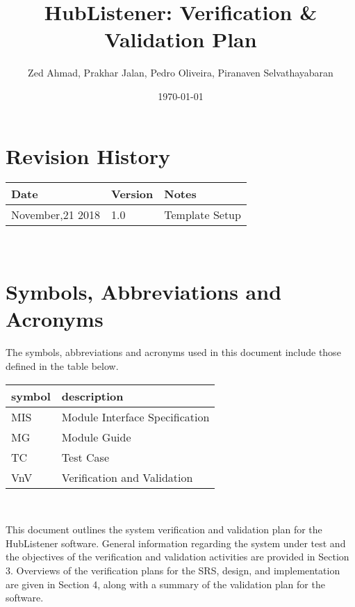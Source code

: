 \documentclass[12pt, titlepage]{article}
\begin{document}
\title{HubListener: Verification \& Validation Plan} 
\author{Zed Ahmad, Prakhar Jalan, Pedro Oliveira, Piranaven Selvathayabaran}
\date{\today}
	
\maketitle


\section{Revision History}

\begin{tabularx}{\textwidth}{p{3cm}p{2cm}X}
\toprule {\bf Date} & {\bf Version} & {\bf Notes}\\
\midrule
November,21 2018 & 1.0 & Template Setup\\
\bottomrule
\end{tabularx}

~\newpage

\section{Symbols, Abbreviations and Acronyms}

The symbols, abbreviations and acronyms used in this document include those defined in the table below. \newline
\renewcommand{\arraystretch}{1.2}

\begin{tabular}{l l} 
  \toprule		
  \textbf{symbol} & \textbf{description}\\
  \midrule 
  MIS & Module Interface Specification\\
  MG & Module Guide \\
  TC & Test Case \\
  VnV & Verification and Validation\\
  \bottomrule
\end{tabular}\\


\newpage

\tableofcontents

\listoftables %

\listoffigures %

\newpage


This document outlines the system verification and validation plan for the HubListener software. General information regarding the system under test and the objectives of the verification and validation activities are provided in Section 3.  Overviews of the verification plans for the SRS, design, and implementation are given in Section 4, along with a summary of the validation plan for the software. 
\end{document}
